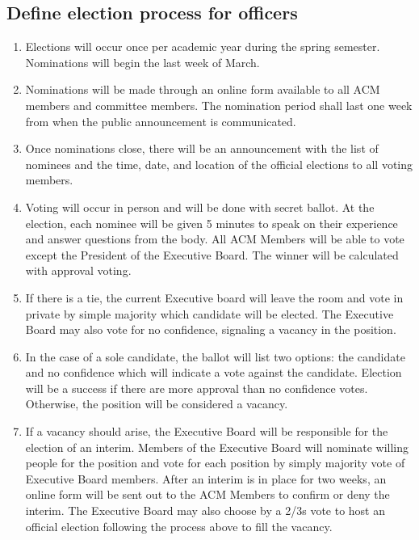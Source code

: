 \subsection{Define election process for officers}
\begin{enumerate}[label=\arabic*.]
  \item Elections will occur once per academic year during the spring semester.
    Nominations will begin the last week of March.
  \item Nominations will be made through an online form available to all ACM
    members and committee members. The nomination period shall last one week
    from when the public announcement is communicated.
  \item Once nominations close, there will be an announcement with the list of
    nominees and the time, date, and location of the official elections to all
    voting members.
  \item Voting will occur in person and will be done with secret ballot. At the
    election, each nominee will be given 5 minutes to speak on their experience
    and answer questions from the body. All ACM Members will be able to vote except
    the President of the Executive Board. The winner will be calculated with
    approval voting.
  \item If there is a tie, the current Executive board will leave the room and
    vote in private by simple majority which candidate will be elected. The
    Executive Board may also vote for no confidence, signaling a vacancy in the
    position.
  \item In the case of a sole candidate, the ballot will list two options: the
    candidate and no confidence which will indicate a vote against the
    candidate. Election will be a success if there are more approval than no
    confidence votes. Otherwise, the position will be considered a vacancy.
  \item If a vacancy should arise, the Executive Board will be responsible for
    the election of an interim. Members of the Executive Board will nominate
    willing people for the position and vote for each position by simply
    majority vote of Executive Board members. After an interim is in place for
    two weeks, an online form will be sent out to the ACM Members to confirm or
    deny the interim. The Executive Board may also choose by a 2/3s vote to host
    an official election following the process above to fill the vacancy.
\end{enumerate}

